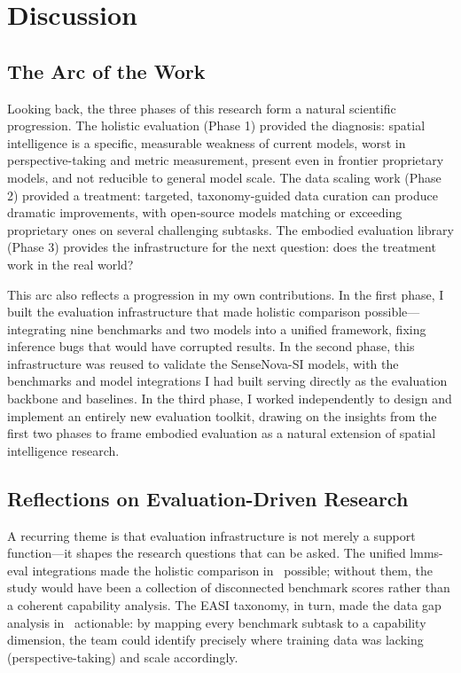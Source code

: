 \documentclass[
hf,
]{confart}
\begin{document}
\section{Discussion}
\label{sec:discussion}

\subsection{The Arc of the Work}

Looking back, the three phases of this research form a natural scientific progression. The holistic evaluation (Phase 1) provided the diagnosis: spatial intelligence is a specific, measurable weakness of current models, worst in perspective-taking and metric measurement, present even in frontier proprietary models, and not reducible to general model scale. The data scaling work (Phase 2) provided a treatment: targeted, taxonomy-guided data curation can produce dramatic improvements, with open-source models matching or exceeding proprietary ones on several challenging subtasks. The embodied evaluation library (Phase 3) provides the infrastructure for the next question: does the treatment work in the real world?

This arc also reflects a progression in my own contributions. In the first phase, I built the evaluation infrastructure that made holistic comparison possible---integrating nine benchmarks and two models into a unified framework, fixing inference bugs that would have corrupted results. In the second phase, this infrastructure was reused to validate the SenseNova-SI models, with the benchmarks and model integrations I had built serving directly as the evaluation backbone and baselines. In the third phase, I worked independently to design and implement an entirely new evaluation toolkit, drawing on the insights from the first two phases to frame embodied evaluation as a natural extension of spatial intelligence research.

\subsection{Reflections on Evaluation-Driven Research}

A recurring theme is that evaluation infrastructure is not merely a support function---it shapes the research questions that can be asked. The unified lmms-eval integrations made the holistic comparison in~\cite{cai2025holisticevaluationmultimodalllms} possible; without them, the study would have been a collection of disconnected benchmark scores rather than a coherent capability analysis. The EASI taxonomy, in turn, made the data gap analysis in~\cite{cai2025scalingspatialintelligencemultimodal} actionable: by mapping every benchmark subtask to a capability dimension, the team could identify precisely where training data was lacking (perspective-taking) and scale accordingly.
\end{document}

